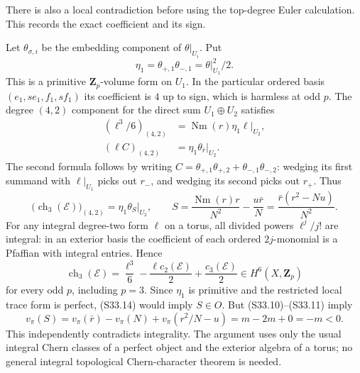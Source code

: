 \begin{remark}
There is also a local contradiction before using the top-degree Euler calculation. This records the exact coefficient and its sign.

Let \(\theta_{\sigma,i}\) be the embedding component of \(\theta|_{U_i}\). Put \[
 \eta_1=\theta_{+,1}\theta_{-,1}
       =\theta|_{U_1}^2/2.
\] This is a primitive \(\mathbf Z_p\)-volume form on \(U_1\). In the particular ordered basis \((e_1,se_1,f_1,sf_1)\) its coefficient is \(4\) up to sign, which is harmless at odd \(p\). The degree \((4,2)\) component for the direct sum \(U_1\oplus U_2\) satisfies \[
 \begin{aligned}
 (\ell^3/6)_{(4,2)}
    &=\operatorname{Nm}(r)\eta_1\ell|_{U_2},\\
 (\ell C)_{(4,2)}
    &=\eta_1\theta_{\bar r}|_{U_2}.
 \end{aligned}
\] The second formula follows by writing \(C=\theta_{+,1}\theta_{+,2}+\theta_{-,1}\theta_{-,2}\): wedging its first summand with \(\ell|_{U_1}\) picks out \(r_-\), and wedging its second picks out \(r_+\). Thus \[
 \bigl(\operatorname{ch}_3(\mathcal E)\bigr)_{(4,2)}
 =\eta_1\theta_S|_{U_2},
 \qquad
 S=\frac{\operatorname{Nm}(r)r}{N^2}-\frac{u\bar r}{N}
   =\frac{\bar r(r^2-Nu)}{N^2}.
 \tag{S33.14}
\] For any integral degree-two form \(\ell\) on a torus, all divided powers \(\ell^j/j!\) are integral: in an exterior basis the coefficient of each ordered \(2j\)-monomial is a Pfaffian with integral entries. Hence \[
 \operatorname{ch}_3(\mathcal E)
 =\frac{\ell^3}{6}-\frac{\ell c_2(\mathcal E)}2
                         +\frac{c_3(\mathcal E)}2
 \in H^6(X,\mathbf Z_p)
\] for every odd \(p\), including \(p=3\). Since \(\eta_1\) is primitive and the restricted local trace form is perfect, (S33.14) would imply \(S\in O\). But (S33.10)--(S33.11) imply \[
 v_\pi(S)=v_\pi(\bar r)-v_\pi(N)
                  +v_\pi(r^2/N-u)=m-2m+0=-m<0.
\] This independently contradicts integrality. The argument uses only the usual integral Chern classes of a perfect object and the exterior algebra of a torus; no general integral topological Chern-character theorem is needed.
\end{remark}
